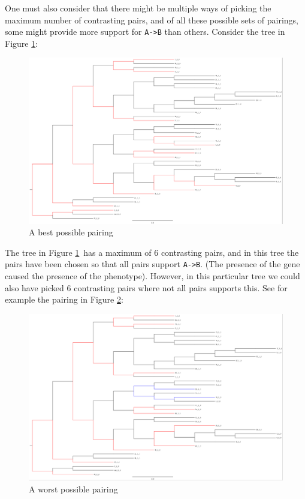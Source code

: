 \documentclass{article}
\begin{document}
    One must also consider that there might be multiple ways of picking the maximum number of contrasting pairs, and of all these possible sets of pairings, some might provide more support for \verb+A->B+ than others. Consider the tree in Figure \ref{fig:best}: \\

    \begin{figure}
      \includegraphics[width=\linewidth]{images/bestpossible.png}
      \caption{A best possible pairing}
      \label{fig:best}
    \end{figure}

    The tree in Figure \ref{fig:best} has a maximum of 6 contrasting pairs, and in this tree the pairs have been chosen so that all pairs support \verb+A->B+. (The presence of the gene caused the presence of the phenotype). However, in this particular tree we could also have picked 6 contrasting pairs where not all pairs supports this. See for example the pairing in Figure \ref{fig:worst}: \\

    \begin{figure}
      \includegraphics[width=\linewidth]{images/worstpossible.png}
      \caption{A worst possible pairing}
      \label{fig:worst}
    \end{figure}
\end{document}
